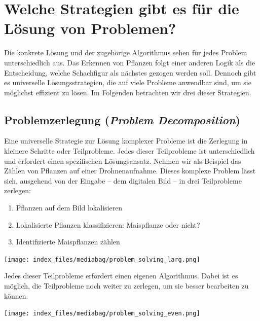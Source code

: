 \documentclass[
  letterpaper,
  DIV=11]{scrreprt}
\begin{document}
\section{Welche Strategien gibt es für die Lösung von
Problemen?}\label{welche-strategien-gibt-es-fuxfcr-die-luxf6sung-von-problemen}

Die konkrete Lösung und der zugehörige Algorithmus sehen für jedes
Problem unterschiedlich aus. Das Erkennen von Pflanzen folgt einer
anderen Logik als die Entscheidung, welche Schachfigur als nächstes
gezogen werden soll. Dennoch gibt es universelle Lösungsstrategien, die
auf viele Probleme anwendbar sind, um sie möglichst effizient zu lösen.
Im Folgenden betrachten wir drei dieser Strategien.

\subsection{\texorpdfstring{Problemzerlegung (\emph{Problem
Decomposition})}{Problemzerlegung (Problem Decomposition)}}\label{problemzerlegung-problem-decomposition}

Eine universelle Strategie zur Lösung komplexer Probleme ist die
Zerlegung in kleinere Schritte oder Teilprobleme. Jedes dieser
Teilprobleme ist unterschiedlich und erfordert einen spezifischen
Lösungsansatz. Nehmen wir als Beispiel das Zählen von Pflanzen auf einer
Drohnenaufnahme. Dieses komplexe Problem lässt sich, ausgehend von der
Eingabe -- dem digitalen Bild -- in drei Teilprobleme zerlegen:

\begin{enumerate}
\def\labelenumi{\arabic{enumi}.}
\item
  Pflanzen auf dem Bild lokalisieren
\item
  Lokalisierte Pflanzen klassifizieren: Maispflanze oder nicht?
\item
  Identifizierte Maispflanzen zählen
\end{enumerate}

\begin{center}
\texttt{[image: index\_files/mediabag/problem\_solving\_larg.png]}
\end{center}

Jedes dieser Teilprobleme erfordert einen eigenen Algorithmus. Dabei ist
es möglich, die Teilprobleme noch weiter zu zerlegen, um sie besser
bearbeiten zu können.

\begin{center}
\texttt{[image: index\_files/mediabag/problem\_solving\_even.png]}
\end{center}
\end{document}
